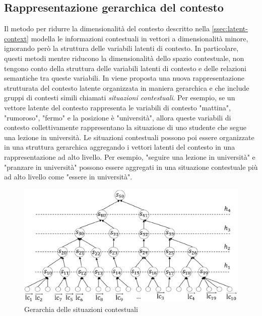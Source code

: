 \documentclass[12pt,italian]{report}
\begin{document}
\subsection{Rappresentazione gerarchica del contesto}
\label{ssec:hierarchical}
Il metodo per ridurre la dimensionalità del contesto descritto nella \autoref{ssec:latent-context} modella le informazioni contestuali in vettori a dimensionalità minore, ignorando però la struttura delle variabili latenti di contesto. In particolare, questi metodi mentre riducono la dimensionalità dello spazio contestuale, non tengono conto della struttura delle variabili latenti di contesto e delle relazioni semantiche tra queste variabili. In \cite{hierarchical-context} viene proposta una nuova rappresentazione strutturata del contesto latente organizzata in maniera gerarchica e che include gruppi di contesti simili chiamati \textit{situazioni contestuali}. Per esempio, se un vettore latente del contesto rappresenta le variabili di contesto "mattina", "rumoroso", "fermo" e la posizione è "università", allora queste variabili di contesto collettivamente rappresentano la situazione di uno studente che segue una lezione in università. Le situazioni contestuali possono poi essere organizzate in una struttura gerarchica aggregando i vettori latenti del contesto in una rappresentazione ad alto livello. Per esempio, "seguire una lezione in università" e "pranzare in università" possono essere aggregati in una situazione contestuale più ad alto livello come "essere in università".

\begin{figure}
 \centering
  \includegraphics[scale=0.70]{immagini/hierarchical.png}
  \caption{Gerarchia delle situazioni contestuali}
  \label{fig:hierarchical}
\end{figure}
\end{document}

